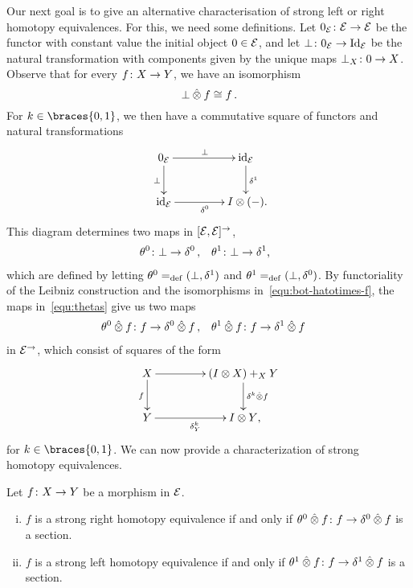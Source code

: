 \documentclass[reqno,10pt,a4paper,oneside,draft]{amsart}
\begin{document}
Our next goal is to give an alternative characterisation of strong left or right homotopy equivalences.
For this, we need some definitions.
Let $0_{\mathcal{E}} \colon \mathcal{E} \to \mathcal{E}$ be the functor with constant value the initial object $0 \in \mathcal{E}$, and let $\bot \colon 0_{\mathcal{E}} \rightarrow \operatorname{Id}_{\mathcal{E}}$ be the natural transformation with components given by the unique maps $\bot_X \colon 0 \to X$.
Observe that for every $f \colon X \to Y$, we have an isomorphism
\begin{equation}
\label{equ:bot-hatotimes-f}
\bot \mathbin{\hat{\otimes}} f \cong f \, .
\end{equation}
For $k \in \braces{0, 1}$, we then have a commutative square of functors and natural transformations
\[
\xymatrix@C+2em{
  0_\catE \ar[r]^{\bot} \ar[d]_{\bot} & \id_\catE \ar[d]^{\rcyl} \\
  \id_\catE \ar[r]_{\lcyl} & \interval \otimes (-) \rlap{.}
}
\]
This diagram determines two maps in $[\mathcal{E}, \mathcal{E}]^\to$,
\begin{equation} \label{equ:thetas}
\begin{aligned}
  \thetar &\co \bot \rightarrow \lcyl
\, ,&
  \thetal &\co \bot \rightarrow \rcyl \rlap{,}
\end{aligned}
\end{equation}
which are defined by letting $\theta^{0} =_{\operatorname{def}} (\bot, \delta^1)$ and $\theta^{1} =_{\operatorname{def}} (\bot, \delta^0)$.
By functoriality of the Leibniz construction and the isomorphisms in~\eqref{equ:bot-hatotimes-f}, the maps in~\eqref{equ:thetas} give us two maps
\begin{equation*}
\begin{aligned}
  \theta^{0} \mathbin{\hat{\otimes}} f &\colon f \to \delta^0 \mathbin{\hat{\otimes}} f
\, ,&
  \theta^{1} \mathbin{\hat{\otimes}} f &\colon f \to \delta^1 \mathbin{\hat{\otimes}} f
\end{aligned}
\end{equation*}
in $\mathcal{E}^\to$, which consist of squares of the form
\[
\xymatrix@C+2em{
  X \ar[r] \ar[d]_{f} & (\interval \otimes X) +_{X} Y \ar[d]^{\kcyl \hatotimes f} \\
  Y \ar[r]_{\kcyl_Y} & \interval \otimes Y \rlap{,}
}
\]
for $k \in \braces{0, 1}$.
We can now provide a characterization of strong homotopy equivalences.

\begin{proposition} \label{strong-h-equiv-as-section}
Let $f \colon X \to Y$ be a morphism in $\mathcal{E}$.
\begin{enumerate}[(i)]
\item $f$ is a strong right homotopy equivalence if and only if $\theta^{0} \mathbin{\hat{\otimes}} f \colon f \rightarrow \delta^0 \mathbin{\hat{\otimes}} f$ is a section.
\item $f$ is a strong left homotopy equivalence if and only if $\theta^{1} \mathbin{\hat{\otimes}} f \colon f \rightarrow \delta^1 \mathbin{\hat{\otimes}} f$ is a section.
\end{enumerate}
\end{proposition}
\end{document}
